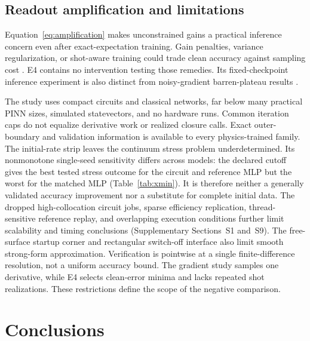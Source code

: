 \documentclass[11pt]{article}
\begin{document}
\subsection{Readout amplification and limitations}

Equation~\eqref{eq:amplification} makes unconstrained gains a practical
inference concern even after exact-expectation training. Gain penalties,
variance regularization, or shot-aware training could trade clean accuracy
against sampling cost \citep{Kreplin2024}. E4 contains no intervention
testing those remedies. Its fixed-checkpoint inference experiment is also
distinct from noisy-gradient barren-plateau results \citep{WangNoise2021}.

The study uses compact circuits and classical networks, far below many
practical PINN sizes, simulated statevectors, and no hardware runs.
Common iteration caps do not equalize derivative work or realized closure
calls. Exact outer-boundary and validation information is available to
every physics-trained family. The initial-rate strip leaves the continuum
stress problem underdetermined. Its nonmonotone single-seed sensitivity
differs across models: the declared cutoff gives the best tested stress
outcome for the circuit and reference MLP but the worst for the matched
MLP (Table~\ref{tab:xmin}). It is therefore neither a generally validated
accuracy improvement nor a substitute for complete initial data.
The dropped high-collocation circuit jobs, sparse efficiency replication,
thread-sensitive reference replay, and overlapping execution conditions
further limit scalability and timing conclusions (Supplementary
Sections~S1 and~S9).
The free-surface startup corner and rectangular switch-off interface also
limit smooth strong-form approximation. Verification is pointwise at a
single finite-difference resolution, not a uniform accuracy bound.
The gradient study samples one derivative, while E4 selects clean-error
minima and lacks repeated shot realizations. These restrictions define the
scope of the negative comparison.

\section{Conclusions}
\end{document}
